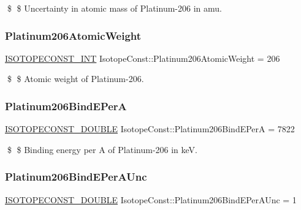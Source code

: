 \$ \$ Uncertainty in atomic mass of Platinum-\/206 in amu. \mbox{\label{group___isotope_const-_platinum-_pt206_ga48d95d13c49f70b7c8b0333ee6bb03b5}} 
\subsubsection{\texorpdfstring{Platinum206\+Atomic\+Weight}{Platinum206AtomicWeight}}
{\footnotesize\ttfamily \mbox{\hyperlink{group___isotope_const-_macros_ga5f18360b3e99483a35c32d789e62621c}{I\+S\+O\+T\+O\+P\+E\+C\+O\+N\+S\+T\+\_\+\+I\+NT}} Isotope\+Const\+::\+Platinum206\+Atomic\+Weight = 206}

\$ \$ Atomic weight of Platinum-\/206. \mbox{\label{group___isotope_const-_platinum-_pt206_ga10ac721dbac87691ef5f379df0d4a3e7}} 
\subsubsection{\texorpdfstring{Platinum206\+Bind\+E\+PerA}{Platinum206BindEPerA}}
{\footnotesize\ttfamily \mbox{\hyperlink{group___isotope_const-_macros_ga8f45a7272ce02c0b4c65c44636ed719a}{I\+S\+O\+T\+O\+P\+E\+C\+O\+N\+S\+T\+\_\+\+D\+O\+U\+B\+LE}} Isotope\+Const\+::\+Platinum206\+Bind\+E\+PerA = 7822}

\$ \$ Binding energy per A of Platinum-\/206 in keV. \mbox{\label{group___isotope_const-_platinum-_pt206_ga77af2467300f084729f63b92d2879bb2}} 
\subsubsection{\texorpdfstring{Platinum206\+Bind\+E\+Per\+A\+Unc}{Platinum206BindEPerAUnc}}
{\footnotesize\ttfamily \mbox{\hyperlink{group___isotope_const-_macros_ga8f45a7272ce02c0b4c65c44636ed719a}{I\+S\+O\+T\+O\+P\+E\+C\+O\+N\+S\+T\+\_\+\+D\+O\+U\+B\+LE}} Isotope\+Const\+::\+Platinum206\+Bind\+E\+Per\+A\+Unc = 1}

